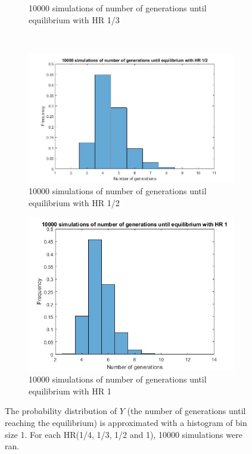 \begin{figure}[H]
\begin{subfigure}{0.4\textwidth}
        \caption{10000 simulations of number of generations until equilibrium with HR 1/3}
        \label{fig:tiger}
    \end{subfigure}
    ~ %
    \begin{subfigure}{0.4\textwidth}
        \includegraphics[width=\textwidth]{GenormHistogramAantalgen2}
        \caption{10000 simulations of number of generations until equilibrium with HR 1/2}
        \label{minimal happiness 1}
    \end{subfigure}
    \begin{subfigure}{0.4\textwidth}
        \includegraphics[width=\textwidth]{GenormHistogramAantalgen1}
        \caption{10000 simulations of number of generations until equilibrium with HR 1}
        \label{minimal happiness 2}
    \end{subfigure}
    \caption{The probability distribution of $Y$ (the number of generations until reaching the equilibrium) is approximated with a histogram of bin size 1. For each HR(1/4, 1/3, 1/2 and 1), 10000 simulations were ran.}\label{fig:histogram}
\end{figure}

